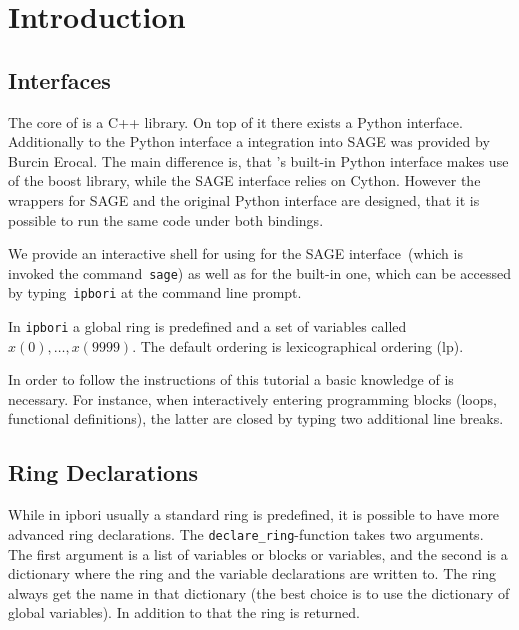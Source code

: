 \section{Introduction}
\subsection{Interfaces}
The core of \PolyBoRi is a C++ library. On top of it there exists a Python interface.
Additionally to the Python interface a integration into SAGE was provided by Burcin Erocal.
The main difference is, that \PolyBoRi's built-in Python interface makes use of
the boost library, while the SAGE interface relies on Cython. 
However the wrappers for SAGE and the original Python interface are designed, that it is possible to run the same code under both bindings.

We provide an interactive shell for \PolyBoRi using \ipython for the SAGE
interface~(which is invoked the command~\texttt{sage}) as well as for the
built-in one, which can be accessed by typing~\texttt{ipbori}
at the command line prompt.


In \texttt{ipbori} a global ring is predefined and a set of variables called  $x(0), \ldots, x(9999)$. The default ordering is lexicographical ordering (lp).

In order to follow the instructions of this tutorial a basic knowledge of 
\ipython is necessary. For instance, when  interactively entering programming
blocks (loops, functional definitions), the latter are closed by typing two
additional line breaks.

\subsection{Ring Declarations}
While in ipbori usually a standard ring is predefined,
it is possible to have more advanced ring declarations.
The \lstinline|declare_ring|-function takes two arguments.
The first argument is a list of variables or blocks or variables, and the second is a dictionary where the ring and the variable declarations are written to. The ring always get the name  in that dictionary (the best choice is to use the dictionary of global variables). In addition to that the ring is returned.
